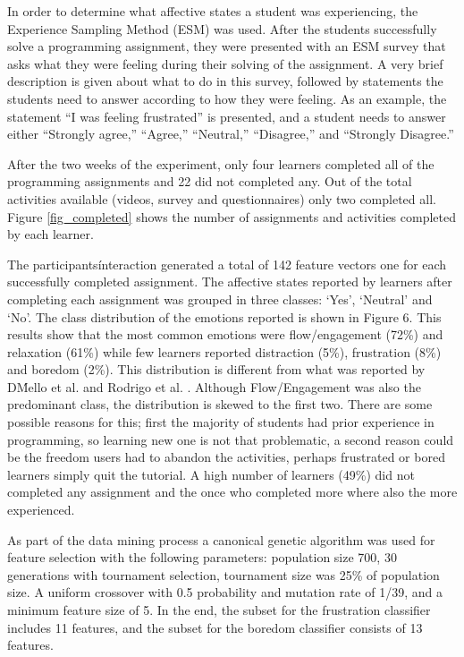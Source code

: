 \documentclass[a4paper,twoside]{article}
\begin{document}
In order to determine what affective states a student was experiencing, the
Experience Sampling Method (ESM) \cite{kubey1996experience} was used.
After the students successfully solve a programming assignment, they were presented
with an ESM survey that asks what they were feeling during their solving of the
assignment. A very brief description is given about what to do in this survey,
followed by statements the students need to answer according to how they were
feeling. As an example, the statement “I was feeling frustrated” is presented,
and a student needs to answer either “Strongly agree,” “Agree,” “Neutral,”
“Disagree,” and “Strongly Disagree.”

After the two weeks of the experiment, only four learners completed all of the
programming assignments and 22 did not completed any. Out of the total activities
available (videos, survey and questionnaires) only two completed all. Figure \ref{fig_completed}
shows the number of assignments and activities completed by each learner.

The participants\' interaction generated a total of 142 feature vectors one for each
successfully completed assignment. The affective states reported by learners after
completing each assignment was grouped in three classes: ‘Yes’, ‘Neutral’ and
‘No’. The class distribution of the emotions reported is shown in Figure 6. This
results show that the most common emotions were flow/engagement (72\%) and
relaxation (61\%) while few learners reported distraction (5\%), frustration
(8\%) and boredom (2\%). This distribution is different from what was reported
by D\'Mello et al. \cite{bixler2013detecting} and Rodrigo et al. \cite{rodrigo2009affective}.
Although Flow/Engagement was
also the predominant class, the distribution is skewed to the first two. There
are some possible reasons for this; first the majority of students had
prior experience in programming, so learning new one is not that problematic, a second
reason could be the freedom users had to abandon the activities, perhaps
frustrated or bored learners simply quit the tutorial. A high number of learners
(49\%) did not completed any assignment and the once who completed more where also
the more experienced.

As part of the data mining process a canonical genetic algorithm was used for feature
selection with the following parameters: population size 700, 30 generations with
tournament selection, tournament size was 25\% of population size. A uniform crossover
with 0.5 probability and mutation rate of 1/39, and a minimum feature size of 5.
In the end, the subset for the frustration classifier includes 11 features, and the subset for the boredom classifier consists of
13 features.
\end{document}
